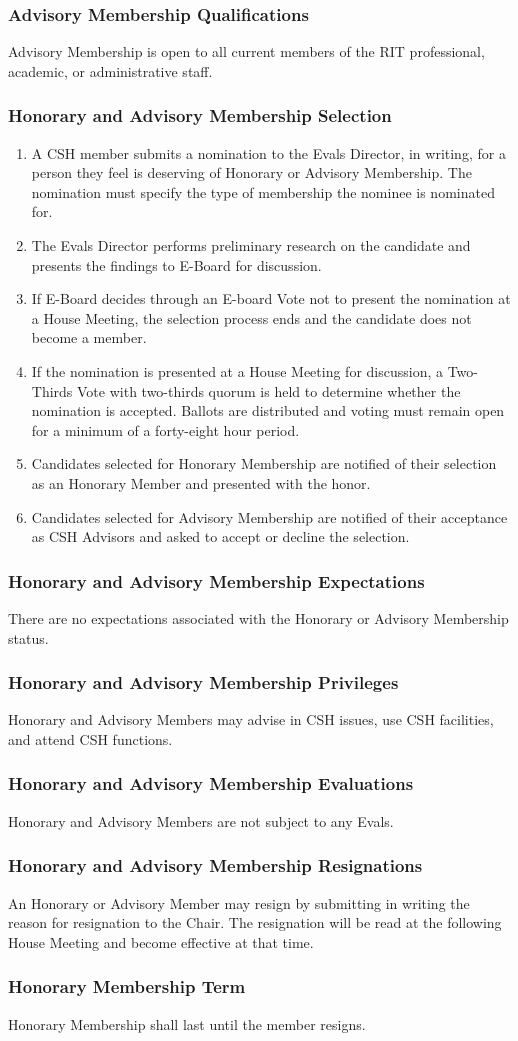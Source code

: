 \documentclass{article}
\newcommand{\asubsection}[1]{\subsubsection{#1} \label{#1}}
\begin{document}
\asubsection{Advisory Membership Qualifications}
Advisory Membership is open to all current members of the RIT professional, academic, or administrative staff.

\asubsection{Honorary and Advisory Membership Selection}
\begin{enumerate}
	\item A CSH member submits a nomination to the Evals Director, in writing, for a person they feel is deserving of Honorary or Advisory Membership. The nomination must specify the type of membership the nominee is nominated for.
	\item The Evals Director performs preliminary research on the candidate and presents the findings to E-Board for discussion.
	\item If E-Board decides through an E-board Vote not to present the nomination at a House Meeting, the selection process ends and the candidate does not become a member.
	\item If the nomination is presented at a House Meeting for discussion, a Two-Thirds Vote with two-thirds quorum is held to determine whether the nomination is accepted.
	      Ballots are distributed and voting must remain open for a minimum of a forty-eight hour period.
	\item Candidates selected for Honorary Membership are notified of their selection as an Honorary Member and presented with the honor.
	\item Candidates selected for Advisory Membership are notified of their acceptance as CSH Advisors and asked to accept or decline the selection.
\end{enumerate}

\asubsection{Honorary and Advisory Membership Expectations}
There are no expectations associated with the Honorary or Advisory Membership status.

\asubsection{Honorary and Advisory Membership Privileges}
Honorary and Advisory Members may advise in CSH issues, use CSH facilities, and attend CSH functions.

\asubsection{Honorary and Advisory Membership Evaluations}
Honorary and Advisory Members are not subject to any Evals.

\asubsection{Honorary and Advisory Membership Resignations}
An Honorary or Advisory Member may resign by submitting in writing the reason for resignation to the Chair.
The resignation will be read at the following House Meeting and become effective at that time.

\asubsection{Honorary Membership Term}
Honorary Membership shall last until the member resigns.
\end{document}
